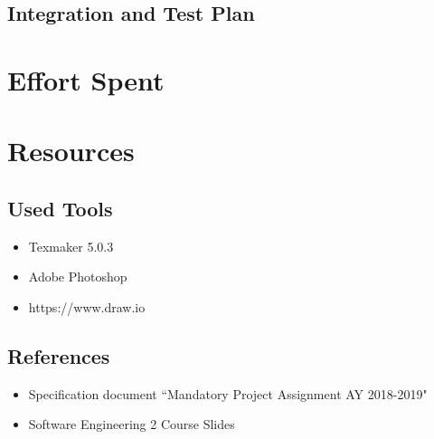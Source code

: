 \documentclass{article}
\begin{document}
\subsection{Integration and Test Plan}
\newpage
\section{Effort Spent}
\section{Resources}
\subsection{Used Tools}
\begin{itemize}
\item Texmaker 5.0.3
\item Adobe Photoshop
\item https://www.draw.io
\end{itemize}
\subsection{References}
\begin{itemize}
\item Specification document “Mandatory Project Assignment AY 2018-2019"
\item Software Engineering 2 Course Slides
\end{itemize}
\newpage
\end{document}
